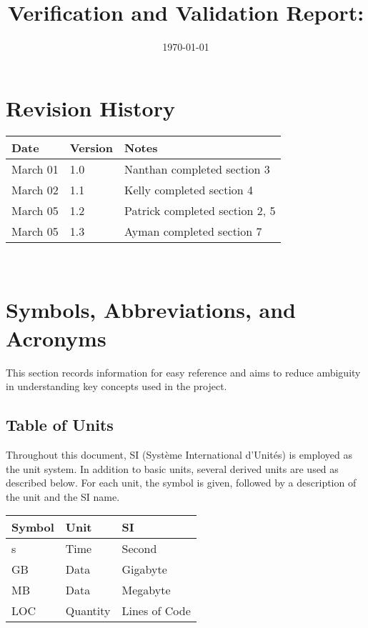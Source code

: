 \documentclass[12pt, titlepage]{article}
\begin{document}
\title{Verification and Validation Report: \progname} 
\author{\authname}
\date{\today}
	
\maketitle


\section{Revision History}

\begin{tabularx}{\textwidth}{p{3cm}p{2cm}X}
\toprule {\bf Date} & {\bf Version} & {\bf Notes}\\
\midrule
March 01 & 1.0 & Nanthan completed section 3\\
March 02 & 1.1 & Kelly completed section 4\\
March 05 & 1.2 & Patrick completed section 2, 5\\
March 05 & 1.3 & Ayman completed section 7\\
\bottomrule
\end{tabularx}

~\newpage

\section{Symbols, Abbreviations, and Acronyms}
This section records information for easy reference and aims to reduce ambiguity in understanding key concepts used in the project.

\subsection{Table of Units}

Throughout this document, SI (Système International d'Unités) is employed as the unit system. In addition to basic units, several derived units are used as described below. For each unit, the symbol is given, followed by a description of the unit and the SI name.

\renewcommand{\arraystretch}{1.2}
\noindent \begin{tabular}{l l l} 
    \toprule		
    \textbf{Symbol} & \textbf{Unit} & \textbf{SI}\\
    \midrule 
    \si{s} & Time & Second\\
    \si{GB} & Data & Gigabyte\\
    \si{MB} & Data & Megabyte\\
    \si{LOC} & Quantity & Lines of Code\\
    \bottomrule
\end{tabular}
\end{document}

